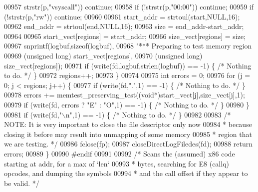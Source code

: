 \begin{DoxyCode}
{{{{{{{{{{{{{{{{{{{{{{{{{{{{{{{{{{{{{{{{{{{{{{{{{{{{{{{{{{{{{{{{00957             strstr(p,\textcolor{stringliteral}{"vsyscall"})) \textcolor{keywordflow}{continue};
00958         \textcolor{keywordflow}{if} (!strstr(p,\textcolor{stringliteral}{"00:00"})) \textcolor{keywordflow}{continue};
00959         \textcolor{keywordflow}{if} (!strstr(p,\textcolor{stringliteral}{"rw"})) \textcolor{keywordflow}{continue};
00960 
00961         start\_addr = strtoul(start,NULL,16);
00962         end\_addr = strtoul(end,NULL,16);
00963         size = end\_addr-start\_addr;
00964 
00965         start\_vect[regions] = start\_addr;
00966         size\_vect[regions] = size;
00967         snprintf(logbuf,\textcolor{keyword}{sizeof}(logbuf),
00968             \textcolor{stringliteral}{"*** Preparing to test memory region %
00969                 (\textcolor{keywordtype}{unsigned} \textcolor{keywordtype}{long}) start\_vect[regions],
00970                 (\textcolor{keywordtype}{unsigned} \textcolor{keywordtype}{long}) size\_vect[regions]);
00971         \textcolor{keywordflow}{if} (write(fd,logbuf,strlen(logbuf)) == -1) \{ \textcolor{comment}{/* Nothing to do. */} \}
00972         regions++;
00973     \}
00974 
00975     \textcolor{keywordtype}{int} errors = 0;
00976     \textcolor{keywordflow}{for} (j = 0; j < regions; j++) \{
00977         \textcolor{keywordflow}{if} (write(fd,\textcolor{stringliteral}{"."},1) == -1) \{ \textcolor{comment}{/* Nothing to do. */} \}
00978         errors += memtest\_preserving\_test((\textcolor{keywordtype}{void}*)start\_vect[j],size\_vect[j],1);
00979         \textcolor{keywordflow}{if} (write(fd, errors ? \textcolor{stringliteral}{"E"} : \textcolor{stringliteral}{"O"},1) == -1) \{ \textcolor{comment}{/* Nothing to do. */} \}
00980     \}
00981     \textcolor{keywordflow}{if} (write(fd,\textcolor{stringliteral}{"\(\backslash\)n"},1) == -1) \{ \textcolor{comment}{/* Nothing to do. */} \}
00982 
00983     \textcolor{comment}{/* NOTE: It is very important to close the file descriptor only now}
00984 \textcolor{comment}{     * because closing it before may result into unmapping of some memory}
00985 \textcolor{comment}{     * region that we are testing. */}
00986     fclose(fp);
00987     closeDirectLogFiledes(fd);
00988     \textcolor{keywordflow}{return} errors;
00989 \}
00990 \textcolor{preprocessor}{#}\textcolor{preprocessor}{endif}
00991 
00992 \textcolor{comment}{/* Scans the (assumed) x86 code starting at addr, for a max of `len`}
00993 \textcolor{comment}{ * bytes, searching for E8 (callq) opcodes, and dumping the symbols}
00994 \textcolor{comment}{ * and the call offset if they appear to be valid. */}
}}}}}}}}}}}}}}}}}}}}}}}}}}}}}}}}}}}}}}}}}}}}}}}}}}}}}}}}}}}}}}}}}
\end{DoxyCode}
